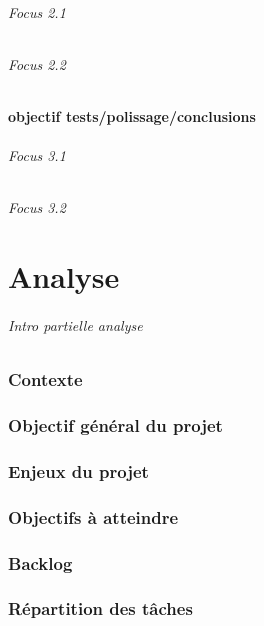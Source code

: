 \documentclass[
	headsepline=on,
	footsepline=on,
	twoside=off,
	abstract=on,
	DIV=10
]{scrreprt}
\begin{document}
				\paragraph{Focus 2.1}
				
				\paragraph{Focus 2.2}
				
				
			\subsection{objectif tests/polissage/conclusions}
				\paragraph{Focus 3.1}
				
				\paragraph{Focus 3.2}
				
		
	\part{Analyse}
		\paragraph{Intro partielle analyse}
		
		\section{Contexte}
		\section{Objectif général du projet}
		\section{Enjeux du projet}
		\section{Objectifs à atteindre}
		\section{Backlog}
		\section{Répartition des tâches}
\end{document}
